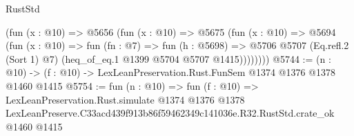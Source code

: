 \begin{lexlean}{RustStd}
\begin{coremodule}
          (fun (x : @10) =>
          @5656
            (fun (x : @10) =>
            @5675
              (fun (x : @10) =>
              @5694
                (fun (x : @10) =>
                fun (fn : @7) =>
                fun (h : @5698) =>
                @5706 @5707 (Eq.refl.{2} (Sort 1) @7) (heq_of_eq.{1} @1399 @5704 @5707 @1415))))))))
@5744 := (n : @10) -> (f : @10) -> LexLeanPreservation.Rust.FunSem @1374 @1376 @1378 @1460 @1415
@5754 := fun (n : @10) =>
  fun (f : @10) =>
  LexLeanPreservation.Rust.simulate
    @1374
    @1376
    @1378
    LexLeanPreserve.C33acd439f913b86f59462349c141036e.R32.RustStd.crate_ok
    @1460
    @1415
\end{coremodule}
\end{lexlean}
